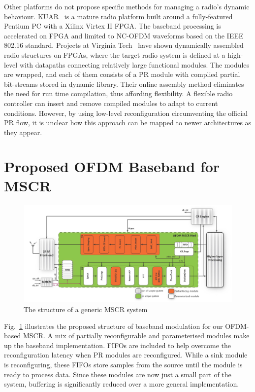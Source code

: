 Other platforms do not propose specific methods for managing a radio's dynamic behaviour.
KUAR~\cite{Minden2007} is a mature radio platform built around a fully-featured Pentium PC with a Xilinx Virtex II FPGA.
The baseband processing is accelerated on FPGA and limited to NC-OFDM waveforms based on the IEEE 802.16 standard.
Projects at Virginia Tech~\cite{athanaswires} have shown dynamically assembled radio structures on FPGAs, where the target radio system is defined at a high-level with datapaths connecting relatively large functional modules.
The modules are wrapped, and each of them consists of a PR module with complied partial bit-streams stored in dynamic library.
Their online assembly method eliminates the need for run time compilation, thus affording flexibility.
A flexible radio controller can insert and remove compiled modules to adapt to current conditions.
However, by using low-level reconfiguration circumventing the official PR flow, it is unclear how this approach can be mapped to newer architectures as they appear.

\section{Proposed OFDM Baseband for MSCR}
\begin{figure}
\centering
\includegraphics[width=1\columnwidth]{Figures/MSCRFig.pdf}
\caption{The structure of a generic MSCR system}
\label{fig:struc}
\end{figure}

Fig.~\ref{fig:struc} illustrates the proposed structure of baseband modulation for our OFDM-based MSCR.
A mix of partially reconfigurable and parameterised modules make up the baseband implementation.
FIFOs are included to help overcome the reconfiguration latency when PR modules are reconfigured.
While a sink module is reconfiguring, these FIFOs store samples from the source until the module is ready to process data.
Since these modules are now just a small part of the system, buffering is significantly reduced over a more general implementation.

